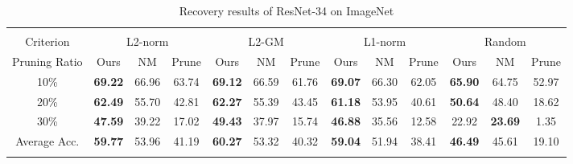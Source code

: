 \begin{table*}[t]
{\begin{tabular}{c||c|c|c||c|c|c||c|c|c||c|c|c}  \Xhline{2\arrayrulewidth}
\multicolumn{13}{c}{\textbf{ResNet34 - ImageNet (Acc. 73.27)}}
\\ \Xhline{2\arrayrulewidth} %
Criterion & \multicolumn{3}{c||}{L2-norm} & \multicolumn{3}{c||}{L2-GM} & \multicolumn{3}{c||}{L1-norm}& \multicolumn{3}{c}{Random}\\ \hline
Pruning Ratio& Ours& NM& Prune& Ours& NM& Prune& Ours& NM& Prune& Ours& NM& Prune\\ \Xhline{2\arrayrulewidth}
10\%& \textbf{69.22} & 66.96 & 63.74 & \textbf{69.12} & 66.59 & 61.76 & \textbf{69.07} & 66.30 & 62.05 & \textbf{65.90} & 64.75& 52.97 \\ \hline
20\%& \textbf{62.49} & 55.70 & 42.81 & \textbf{62.27} & 55.39 & 43.45 & \textbf{61.18} & 53.95 & 40.61 & \textbf{50.64} & 48.40& 18.62 \\ \hline
30\%& \textbf{47.59} & 39.22 & 17.02 & \textbf{49.43} & 37.97 & 15.74 & \textbf{46.88} & 35.56 & 12.58 & 22.92 & \textbf{23.69} & 1.35  \\ \Xhline{2\arrayrulewidth}
Average Acc. & \textbf{59.77} & 53.96 & 41.19 & \textbf{60.27} & 53.32 & 40.32 & \textbf{59.04} & 51.94 & 38.41 & \textbf{46.49} & 45.61& 19.10\\ \Xhline{2\arrayrulewidth}
\end{tabular}
}
\vspace{2mm}
\caption{Recovery results of ResNet-34 on ImageNet}
\label{tab:ResNet34-ImageNet}
\vspace{1.5mm}

{\normalsize

}
\end{table*}
